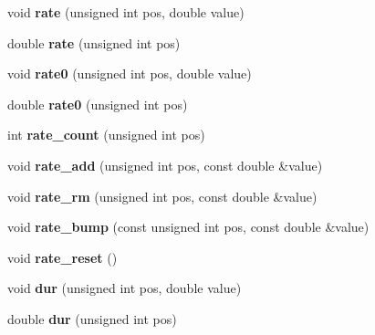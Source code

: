 \begin{DoxyCompactItemize}
\item 
\mbox{\label{classodeproblem_af6e95b3ef6e66fd90bd74d9d3e4cfdb9}} 
void {\bfseries rate} (unsigned int pos, double value)
\item 
\mbox{\label{classodeproblem_abb46c0c4c4ba37273775f207989b8593}} 
double {\bfseries rate} (unsigned int pos)
\item 
\mbox{\label{classodeproblem_a037f4a9a3c152237557d092f5c9b18f2}} 
void {\bfseries rate0} (unsigned int pos, double value)
\item 
\mbox{\label{classodeproblem_a1a26afe1439b4b827e346a1eec4d5284}} 
double {\bfseries rate0} (unsigned int pos)
\item 
\mbox{\label{classodeproblem_a7b5b4b266d8205069f6fa806fec959bd}} 
int {\bfseries rate\+\_\+count} (unsigned int pos)
\item 
\mbox{\label{classodeproblem_a7985d0d2c71f3210fa043038efa7696b}} 
void {\bfseries rate\+\_\+add} (unsigned int pos, const double \&value)
\item 
\mbox{\label{classodeproblem_a6cd2af7fdeca1734d4ac96c31286b086}} 
void {\bfseries rate\+\_\+rm} (unsigned int pos, const double \&value)
\item 
\mbox{\label{classodeproblem_aec484a1e3327cac5360e9b323ce995f6}} 
void {\bfseries rate\+\_\+bump} (const unsigned int pos, const double \&value)
\item 
\mbox{\label{classodeproblem_a89919c8495a969c85027b645cc611549}} 
void {\bfseries rate\+\_\+reset} ()
\item 
\mbox{\label{classodeproblem_a6b01a064fdeca43c8d70c9acaf4cd01a}} 
void {\bfseries dur} (unsigned int pos, double value)
\item 
\mbox{\label{classodeproblem_aa55e249b79cee0dd7292e2e26c512d4d}} 
double {\bfseries dur} (unsigned int pos)
\item 
\mbox{\label{classodeproblem_ae7047dc9fe7335cb4367a90a945801b5}} 

\end{DoxyCompactItemize}
